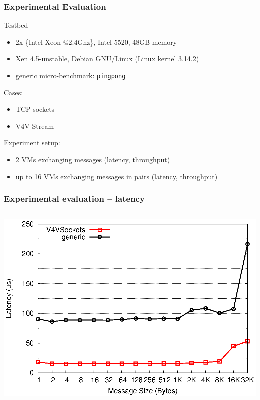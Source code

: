 \documentclass[red,slidestop,notes,compress,mathserif]{beamer}
\begin{document}
\begin{frame}
\frametitle{Experimental Evaluation}
\begin{block}{Testbed}
\begin{itemize}
\item 2x \{Intel Xeon @2.4Ghz\}, Intel 5520, 48GB memory
\item Xen 4.5-unstable, Debian GNU/Linux (Linux kernel 3.14.2)
\item generic micro-benchmark: \texttt{pingpong}
\end{itemize}
\end{block}
{Cases:}
\begin{itemize}
\item TCP sockets
\item V4V Stream
\end{itemize}
{Experiment setup:}
\begin{itemize}
\item 2 VMs exchanging messages (latency, throughput)
\item up to 16 VMs exchanging messages in pairs (latency, throughput)
\end{itemize}
\end{frame}


\begin{frame}
\frametitle{Experimental evaluation -- latency}
\begin{columns}
\includegraphics[width=\textwidth]{figures/v4v_lat.eps}
\end{columns}
\end{frame}
\end{document}
